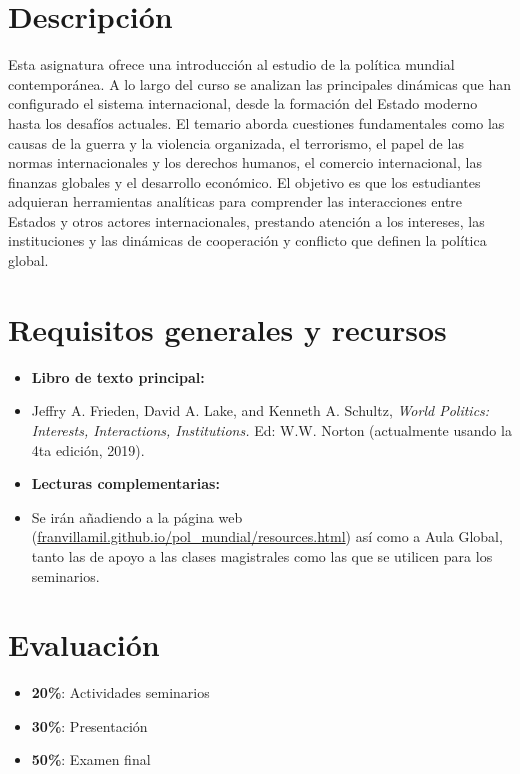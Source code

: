 \documentclass[12pt, a4paper]{article}
\begin{document}
\vspace{10pt}
\section{Descripción}

Esta asignatura ofrece una introducción al estudio de la política mundial contemporánea. A lo largo del curso se analizan las principales dinámicas que han configurado el sistema internacional, desde la formación del Estado moderno hasta los desafíos actuales. El temario aborda cuestiones fundamentales como las causas de la guerra y la violencia organizada, el terrorismo, el papel de las normas internacionales y los derechos humanos, el comercio internacional, las finanzas globales y el desarrollo económico. El objetivo es que los estudiantes adquieran herramientas analíticas para comprender las interacciones entre Estados y otros actores internacionales, prestando atención a los intereses, las instituciones y las dinámicas de cooperación y conflicto que definen la política global.

\clearpage
\section{Requisitos generales y recursos}

\begin{itemize}
    \item[] \textbf{Libro de texto principal:}
    \item Jeffry A. Frieden, David A. Lake, and Kenneth A. Schultz, \textit{World Politics: Interests, Interactions, Institutions.} Ed: W.W. Norton (actualmente usando la 4ta edición, 2019).
    \item[] \textbf{Lecturas complementarias:}
    \item Se irán añadiendo a la página web (\href{https://franvillamil.github.io/pol_mundial/resources.html}{franvillamil.github.io/pol\_mundial/resources.html}) así como a Aula Global, tanto las de apoyo a las clases magistrales como las que se utilicen para los seminarios.
\end{itemize}

\section{Evaluación}

\begin{itemize}
\setlength\itemsep{0pt}
  \item \textbf{20\%}: Actividades seminarios
  \item \textbf{30\%}: Presentación
  \item \textbf{50\%}: Examen final
\end{itemize}
\end{document}
